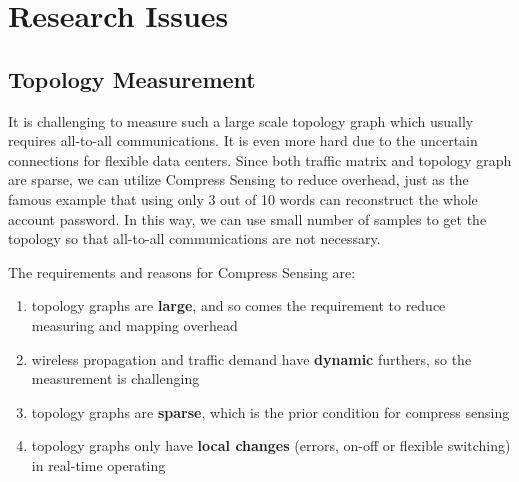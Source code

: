 \documentclass[journal,onecolumn,11pt]{IEEEtran}
\begin{document}

\section{Research Issues}

\subsection{Topology Measurement}

It is challenging to measure such a large scale topology graph which usually requires all-to-all communications. It is even more hard due to the uncertain connections for flexible data centers. Since both traffic matrix \cite{Greenberg:2009:VSF:1592568.1592576,Halperin:2011:ADC:2018436.2018442} and topology graph \cite{Chen:2010:GAA:1851182.1851190} are sparse, we can utilize Compress Sensing to reduce overhead, just as the famous example that using only 3 out of 10 words can reconstruct the whole account password. In this way, we can use small number of samples to get the topology so that all-to-all communications are not necessary.

The requirements and reasons for Compress Sensing are:
\begin{enumerate}
  \item topology graphs are \textbf{large}, and so comes the requirement to reduce measuring and mapping overhead
  \item wireless propagation and traffic demand have \textbf{dynamic} furthers, so the measurement is challenging
  \item topology graphs are \textbf{sparse}, which is the prior condition for compress sensing
  \item topology graphs only have \textbf{local changes} (errors, on-off or flexible switching) in real-time operating
\end{enumerate}
\end{document}
